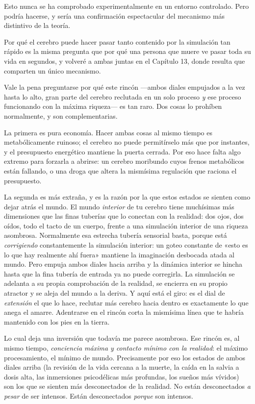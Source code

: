 \documentclass[11pt, twoside, openright]{book}
\begin{document}
Esto nunca se ha comprobado experimentalmente en un entorno controlado. Pero podría hacerse, y sería una confirmación espectacular del mecanismo más distintivo de la teoría.

Por qué el cerebro puede hacer pasar tanto contenido por la simulación tan rápido es la misma pregunta que por qué una persona que muere ve pasar toda su vida en segundos, y volveré a ambas juntas en el Capítulo 13, donde resulta que comparten un único mecanismo.

Vale la pena preguntarse por qué este rincón ---ambos diales empujados a la vez hasta lo alto, gran parte del cerebro reclutada en un solo proceso \textit{y} ese proceso funcionando con la máxima riqueza--- es tan raro. Dos cosas lo prohíben normalmente, y son complementarias.

La primera es pura economía. Hacer ambas cosas al mismo tiempo es metabólicamente ruinoso; el cerebro no puede permitírselo más que por instantes, y el presupuesto energético mantiene la puerta cerrada. Por eso hace falta algo extremo para forzarla a abrirse: un cerebro moribundo cuyos frenos metabólicos están fallando, o una droga que altera la mismísima regulación que raciona el presupuesto.

La segunda es más extraña, y es la razón por la que estos estados se sienten como dejar atrás el mundo. El mundo \textit{interior} de tu cerebro tiene muchísimas más dimensiones que las finas tuberías que lo conectan con la realidad: dos ojos, dos oídos, todo el tacto de un cuerpo, frente a una simulación interior de una riqueza asombrosa. Normalmente esa estrecha tubería sensorial basta, porque está \textit{corrigiendo} constantemente la simulación interior: un goteo constante de «esto es lo que hay realmente ahí fuera» mantiene la imaginación desbocada atada al mundo. Pero empuja ambos diales hacia arriba y la dinámica interior se hincha hasta que la fina tubería de entrada ya no puede corregirla. La simulación se adelanta a su propia comprobación de la realidad, se encierra en su propio atractor y se aleja del mundo a la deriva. Y aquí está el giro: es el dial de \textit{extensión} el que lo hace, reclutar más cerebro hacia dentro es exactamente lo que anega el amarre. Adentrarse en el rincón corta la mismísima línea que te habría mantenido con los pies en la tierra.

Lo cual deja una inversión que todavía me parece asombrosa. Ese rincón es, al mismo tiempo, \textit{conciencia máxima y contacto mínimo con la realidad}: el máximo procesamiento, el mínimo de mundo. Precisamente por eso los estados de ambos diales arriba (la revisión de la vida cercana a la muerte, la caída en la salvia a dosis alta, las inmersiones psicodélicas más profundas, los sueños más vívidos) son los que se sienten más desconectados de la realidad. No están desconectados \textit{a pesar} de ser intensos. Están desconectados \textit{porque} son intensos.
\end{document}
